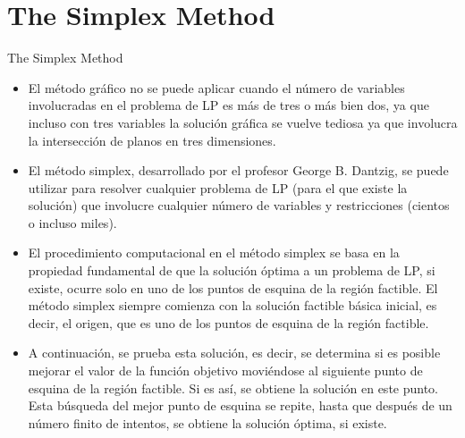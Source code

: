 
\section{The Simplex Method}
\label{sec:simplex-method}


\begin{frame}{The Simplex Method}
  \begin{itemize} \parskip3mm \justifying
  \item<only@1>   El método gráfico no se puede aplicar cuando el número de variables involucradas en el problema de LP es más de tres o más bien dos, ya que incluso \alert{con tres variables la solución gráfica se vuelve tediosa} ya que involucra la intersección de planos en tres dimensiones.

  \item<only@1>   El método simplex, desarrollado por el profesor George B. Dantzig, se puede utilizar para resolver cualquier problema de LP (para el que existe la solución) que involucre cualquier número de variables y restricciones (cientos o incluso miles).
  
  \item<only@2>   El procedimiento computacional en el método simplex \alert{se basa en la propiedad fundamental de que la solución óptima a un problema de LP, si existe, ocurre solo en uno de los puntos de esquina de la región factible.} El método simplex siempre comienza con la solución factible básica inicial, es decir, el origen, que es uno de los puntos de esquina de la región factible.

  \item<only@2>   A continuación, se prueba esta solución, es decir, \alert{se determina si es posible mejorar el valor de la función objetivo moviéndose al siguiente punto de esquina de la región factible.} Si es así, se obtiene la solución en este punto. Esta búsqueda del mejor punto de esquina se repite, hasta que después de un número finito de intentos, se obtiene la solución óptima, si existe.
  \end{itemize}
\end{frame}

